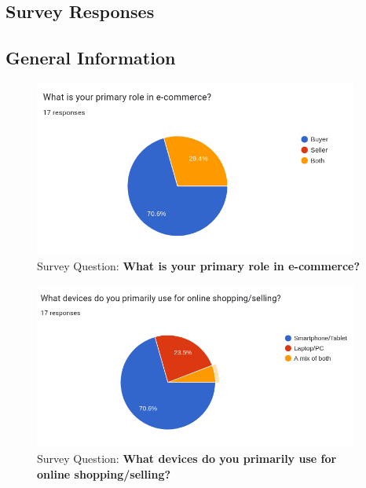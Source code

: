 \documentclass[12pt]{report}
\begin{document}
\begin{appendices}
	\chapter{Survey Responses}

	\section {General Information}
	\begin{figure}[H]
		\begin{center}
			\includegraphics[width=0.95\textwidth]{survey/q1}
		\end{center}
		\caption{Survey Question: \textbf{What is your primary role in e-commerce?}}
	\end{figure}

	\begin{figure}[H]
		\begin{center}
			\includegraphics[width=0.95\textwidth]{survey/q2}
		\end{center}
		\caption{Survey Question: \textbf{What devices do you primarily use for online shopping/selling?}}
	\end{figure}


\end{appendices}
\end{document}
